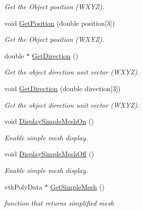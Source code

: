 \begin{DoxyCompactItemize}
\begin{DoxyCompactList}\small\item\em Get the Object position (WXYZ). \item\end{DoxyCompactList}\item 
\hypertarget{classvtkScenarioItem_a923912fa6cca08c3e450ae2d010f83f1}{
void \hyperlink{classvtkScenarioItem_a923912fa6cca08c3e450ae2d010f83f1}{GetPosition} (double position\mbox{[}3\mbox{]})}
\label{classvtkScenarioItem_a923912fa6cca08c3e450ae2d010f83f1}

\begin{DoxyCompactList}\small\item\em Get the Object position (WXYZ). \item\end{DoxyCompactList}\item 
\hypertarget{classvtkScenarioItem_acbb650d8324e6a0b8a33945cb5c06e8f}{
double $\ast$ \hyperlink{classvtkScenarioItem_acbb650d8324e6a0b8a33945cb5c06e8f}{GetDirection} ()}
\label{classvtkScenarioItem_acbb650d8324e6a0b8a33945cb5c06e8f}

\begin{DoxyCompactList}\small\item\em Get the object direction unit vector (WXYZ). \item\end{DoxyCompactList}\item 
\hypertarget{classvtkScenarioItem_aeb259958cef65962ce34e2cd9826283c}{
void \hyperlink{classvtkScenarioItem_aeb259958cef65962ce34e2cd9826283c}{GetDirection} (double direction\mbox{[}3\mbox{]})}
\label{classvtkScenarioItem_aeb259958cef65962ce34e2cd9826283c}

\begin{DoxyCompactList}\small\item\em Get the object direction unit vector (WXYZ). \item\end{DoxyCompactList}\item 
void \hyperlink{classvtkScenarioItem_a9bd7ffa58d7ed0c8f577d127c1654641}{DisplaySimpleMeshOn} ()
\begin{DoxyCompactList}\small\item\em Enable simple mesh display. \item\end{DoxyCompactList}\item 
void \hyperlink{classvtkScenarioItem_ab8c3d0fa282116ca0144cd8fba9545c0}{DisplaySimpleMeshOff} ()
\begin{DoxyCompactList}\small\item\em Enable simple mesh display. \item\end{DoxyCompactList}\item 
vtkPolyData $\ast$ \hyperlink{classvtkScenarioItem_a1c8a6fcb05ff01e2fda8034078f46236}{GetSimpleMesh} ()
\begin{DoxyCompactList}\small\item\em function that returns simplified mesh \item\end{DoxyCompactList}\end{DoxyCompactItemize}
